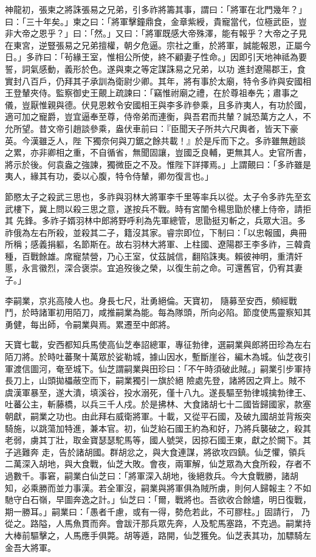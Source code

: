 \begin{pinyinscope}
 神龍初，張柬之將誅張易之兄弟，引多祚將籌其事，謂曰：「將軍在北門幾年？」曰：「三十年矣。」柬之曰：「將軍擊鐘鼎食，金章紫綬，貴寵當代，位極武臣，豈非大帝之恩乎？」曰：「然。」又曰：「將軍既感大帝殊澤，能有報乎？大帝之子見在東宮，逆豎張易之兄弟擅權，朝夕危逼。宗社之重，於將軍，誠能報恩，正屬今日。」多祚曰：「茍緣王室，惟相公所使，終不顧妻子性命。」因即引天地神祗為要誓，詞氣感動，義形於色。遂與柬之等定謀誅易之兄弟，以功
 進封遼陽郡王，食實封八百戶，仍拜其子承訓為衛尉少卿。其年，將有事於太廟，特令多祚與安國相王登輦夾侍。監察御史王覿上疏諫曰：「竊惟祔廟之禮，在於尊祖奉先；肅事之儀，豈厭惟親與德。伏見恩敕令安國相王與李多祚參乘，且多祚夷人，有功於國，適可加之寵爵，豈宜逼奉至尊，侍帝弟而連衡，與吾君而共輦？誠恐萬方之人，不允所望。昔文帝引趙談參乘，盎伏車前曰：『臣聞天子所共六尺輿者，皆天下豪英。今漢雖乏人，陛
 下獨奈何與刀鋸之餘共載！』於是斥而下之。多祚雖無趙談之累，亦非卿相之重，不自循省，無聞固讓，豈國乏良輔，更無其人。史官所書，將示於後。何袁盎之強諫，獨微臣之不及。惟陛下詳擇焉。」上謂覿曰：「多祚雖是夷人，緣其有功，委以心腹，特令侍輦，卿勿復言也。」



 節愍太子之殺武三思也，多祚與羽林大將軍李千里等率兵以從。太子令多祚先至玄武樓下，冀上問以殺三思之意，遂按兵不戰。時有宮闈令楊思勖於樓上侍帝，請拒其
 先鋒。多祚子婿羽林中郎將野呼利為先軍總管，思勖挺刃斬之，兵眾大沮。多祚俄為左右所殺，並殺其二子，籍沒其家。睿宗即位，下制曰：「以忠報國，典冊所稱；感義捐軀，名節斯在。故右羽林大將軍、上柱國、遼陽郡王李多祚，三韓貴種，百戰餘雄。席寵禁營，乃心王室，仗茲誠信，翻陷誅夷。賴彼神明，重清奸慝，永言徽烈，深合褒崇。宜追歿後之榮，以復生前之命。可還舊官，仍宥其妻子。」



 李嗣業，京兆高陵人也。身長七尺，壯勇絕倫。天寶初，
 隨募至安西，頻經戰鬥，於時諸軍初用陌刀，咸推嗣業為能。每為隊頭，所向必陷。節度使馬靈察知其勇健，每出師，令嗣業與焉。累遷至中郎將。



 天寶七載，安西都知兵馬使高仙芝奉詔總軍，專征勃律，選嗣業與郎將田珍為左右陌刀將。於時吐蕃聚十萬眾於娑勒城，據山因水，塹斷崖谷，編木為城。仙芝夜引軍渡信圖河，奄至城下。仙芝謂嗣業與田珍曰：「不午時須破此賊。」嗣業引步軍持長刀上，山頭拋櫑蔽空而下，嗣業獨引一旗於絕
 險處先登，諸將因之齊上。賊不虞漢軍暴至，遂大潰，填溪谷，投水溺死，僅十八九。遂長驅至勃律城擒勃律王、吐蕃公主，斬藤橋，以兵三千人戍。於是拂林、大食諸胡七十二國皆歸國家，款塞朝獻，嗣業之功也。由此拜右威衛將軍。十載，又從平石國，及破九國胡並背叛突騎施，以跳蕩加特進，兼本官。初，仙芝紿石國王約為和好，乃將兵襲破之，殺其老弱，虜其丁壯，取金寶瑟瑟駝馬等，國人號哭，因掠石國王東，獻之於闕下。其子逃難奔
 走，告於諸胡國。群胡忿之，與大食連謀，將欲攻四鎮。仙芝懼，領兵二萬深入胡地，與大食戰，仙芝大敗。會夜，兩軍解，仙芝眾為大食所殺，存者不過數千。事窘，嗣業白仙芝曰：「將軍深入胡地，後絕救兵。今大食戰勝，諸胡知，必乘勝而並力事漢。若全軍沒，嗣業與將軍俱為賊所虜，則何人歸報主？不如馳守白石嶺，早圖奔逸之計。」仙芝曰：「爾，戰將也。吾欲收合餘燼，明日復戰，期一勝耳。」嗣業曰：「愚者千慮，或有一得，勢危若此，不可膠柱。」固請行，
 乃從之。路隘，人馬魚貫而奔。會跋汗那兵眾先奔，人及駝馬塞路，不克過。嗣業持大棒前驅擊之，人馬應手俱斃。胡等遁，路開，仙芝獲免。仙芝表其功，加驃騎左金吾大將軍。




\end{pinyinscope}
